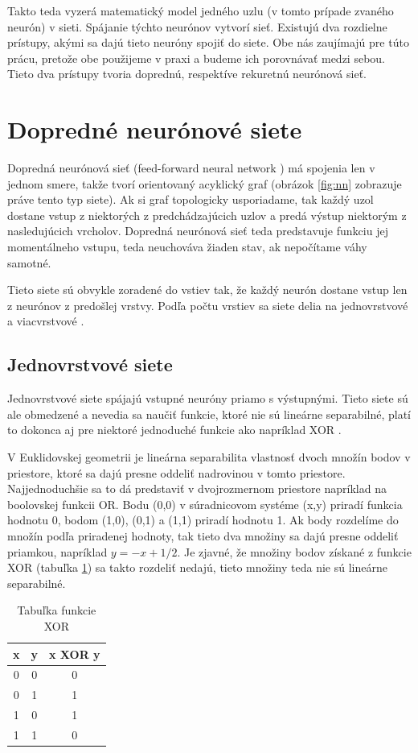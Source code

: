 Takto teda vyzerá matematický model jedného uzlu (v tomto prípade zvaného neurón) v sieti.
Spájanie týchto neurónov vytvorí sieť.
Existujú dva rozdielne prístupy, akými sa dajú tieto neuróny spojiť do siete. 
Obe nás zaujímajú pre túto prácu, pretože obe použijeme v praxi a budeme ich porovnávať medzi sebou. Tieto dva prístupy tvoria doprednú, respektíve rekuretnú neurónová sieť.

\section{Dopredné neurónové siete}
Dopredná neurónová sieť (feed-forward neural network \citep{aima}) má spojenia len v jednom smere, takže tvorí orientovaný acyklický graf (obrázok \ref{fig:nn} zobrazuje práve tento typ siete).
Ak si graf topologicky usporiadame, tak každý uzol dostane vstup z niektorých z predchádzajúcich uzlov a predá výstup niektorým z nasledujúcich vrcholov.
Dopredná neurónová sieť teda predstavuje funkciu jej momentálneho vstupu, teda neuchováva žiaden stav, ak nepočítame váhy samotné.

Tieto siete sú obvykle zoradené do vstiev tak, že každý neurón dostane vstup len z neurónov z predošlej vrstvy.
Podľa počtu vrstiev sa siete delia na jednovrstvové a viacvrstvové .

\subsection{Jednovrstvové siete}
Jednovrstvové siete spájajú vstupné neuróny priamo s výstupnými.
Tieto siete sú ale obmedzené a nevedia sa naučiť funkcie, ktoré nie sú lineárne separabilné, platí to dokonca aj pre niektoré jednoduché funkcie ako napríklad XOR \citep{aima}. 

V Euklidovskej geometrii je lineárna separabilita vlastnosť dvoch množín bodov v priestore, ktoré sa dajú presne oddeliť nadrovinou v tomto priestore. 
Najjednoduchšie sa to dá predstaviť v dvojrozmernom priestore napríklad na boolovskej funkcii OR. Bodu (0,0) v súradnicovom systéme (x,y) priradí funkcia hodnotu 0, bodom (1,0), (0,1) a (1,1) priradí hodnotu 1. Ak body rozdelíme do množín podľa priradenej hodnoty, tak tieto dva množiny sa dajú presne oddeliť priamkou, napríklad $y = -x + 1/2$. Je zjavné, že množiny bodov získané z funkcie XOR (tabuľka \ref{xor}) sa takto rozdeliť nedajú, tieto množiny teda nie sú lineárne separabilné.

\begin{table}[h]
\begin{center}
\begin{tabular}{ |c|c|c| } 
 \hline 
 x & y & x XOR y \\ 
 \hline
 0 & 0 & 0 \\ 
 0 & 1 & 1 \\ 
 1 & 0 & 1 \\ 
 1 & 1 & 0 \\ 
 \hline
\end{tabular}
\caption{Tabuľka funkcie XOR}
\label{xor}
\end{center}
\end{table}

